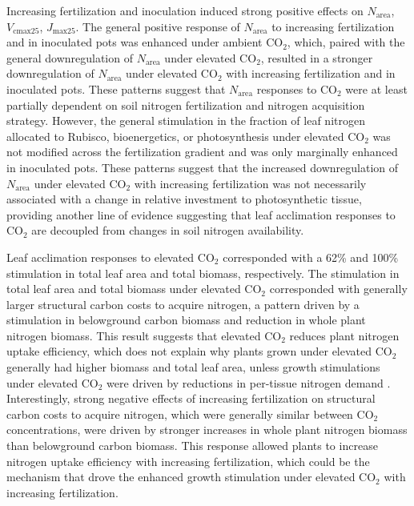 Increasing fertilization and inoculation induced strong positive effects on $N_\mathrm{area}$, $V_\mathrm{cmax25}$, $J_\mathrm{max25}$. The general positive response of $N_\mathrm{area}$ to increasing fertilization and in inoculated pots was enhanced under ambient CO$_2$, which, paired with the general downregulation of $N_\mathrm{area}$ under elevated CO$_2$, resulted in a stronger downregulation of $N_\mathrm{area}$ under elevated CO$_2$ with increasing fertilization and in inoculated pots. These patterns suggest that $N_\mathrm{area}$ responses to CO$_2$ were at least partially dependent on soil nitrogen fertilization and nitrogen acquisition strategy. However, the general stimulation in the fraction of leaf nitrogen allocated to Rubisco, bioenergetics, or photosynthesis under elevated CO$_2$ was not modified across the fertilization gradient and was only marginally enhanced in inoculated pots. These patterns suggest that the increased downregulation of $N_\mathrm{area}$ under elevated CO$_2$ with increasing fertilization was not necessarily associated with a change in relative investment to photosynthetic tissue, providing another line of evidence suggesting that leaf acclimation responses to CO$_2$ are decoupled from changes in soil nitrogen availability.

Leaf acclimation responses to elevated CO$_2$ corresponded with a 62\% and 100\% stimulation in total leaf area and total biomass, respectively. The stimulation in total leaf area and total biomass under elevated CO$_2$ corresponded with generally larger structural carbon costs to acquire nitrogen, a pattern driven by a stimulation in belowground carbon biomass and reduction in whole plant nitrogen biomass. This result suggests that elevated CO$_2$ reduces plant nitrogen uptake efficiency, which does not explain why plants grown under elevated CO$_2$ generally had higher biomass and total leaf area, unless growth stimulations under elevated CO$_2$ were driven by reductions in per-tissue nitrogen demand . Interestingly, strong negative effects of increasing fertilization on structural carbon costs to acquire nitrogen, which were generally similar between CO$_2$ concentrations, were driven by stronger increases in whole plant nitrogen biomass than belowground carbon biomass. This response allowed plants to increase nitrogen uptake efficiency with increasing fertilization, which could be the mechanism that drove the enhanced growth stimulation under elevated CO$_2$ with increasing fertilization.

